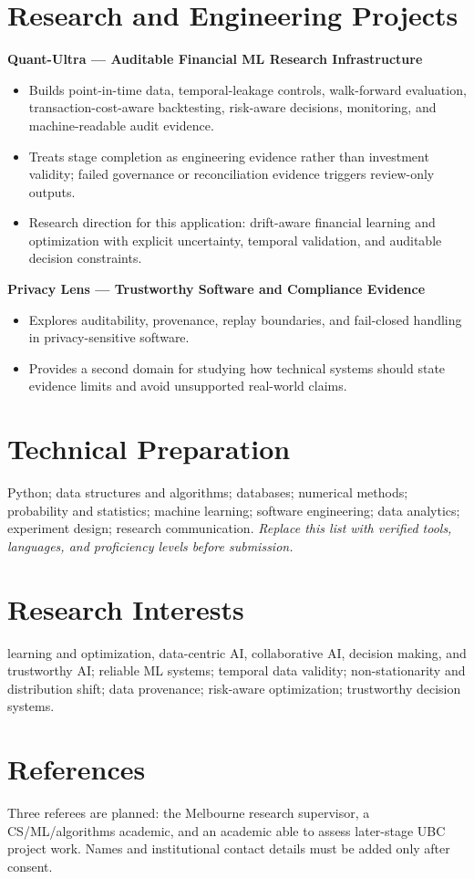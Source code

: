 \documentclass[11pt]{article}
\begin{document}
\section*{Research and Engineering Projects}
\textbf{Quant-Ultra --- Auditable Financial ML Research Infrastructure}
\begin{itemize}
\item Builds point-in-time data, temporal-leakage controls, walk-forward evaluation, transaction-cost-aware backtesting, risk-aware decisions, monitoring, and machine-readable audit evidence.
\item Treats stage completion as engineering evidence rather than investment validity; failed governance or reconciliation evidence triggers review-only outputs.
\item Research direction for this application: drift-aware financial learning and optimization with explicit uncertainty, temporal validation, and auditable decision constraints.
\end{itemize}

\begin{samepage}
\textbf{Privacy Lens --- Trustworthy Software and Compliance Evidence}
\begin{itemize}
\item Explores auditability, provenance, replay boundaries, and fail-closed handling in privacy-sensitive software.
\item Provides a second domain for studying how technical systems should state evidence limits and avoid unsupported real-world claims.
\end{itemize}
\end{samepage}

\section*{Technical Preparation}
Python; data structures and algorithms; databases; numerical methods; probability and statistics; machine learning; software engineering; data analytics; experiment design; research communication. \textit{Replace this list with verified tools, languages, and proficiency levels before submission.}

\section*{Research Interests}
learning and optimization, data-centric AI, collaborative AI, decision making, and trustworthy AI; reliable ML systems; temporal data validity; non-stationarity and distribution shift; data provenance; risk-aware optimization; trustworthy decision systems.

\section*{References}
Three referees are planned: the Melbourne research supervisor, a CS/ML/algorithms academic, and an academic able to assess later-stage UBC project work. Names and institutional contact details must be added only after consent.
\end{document}
